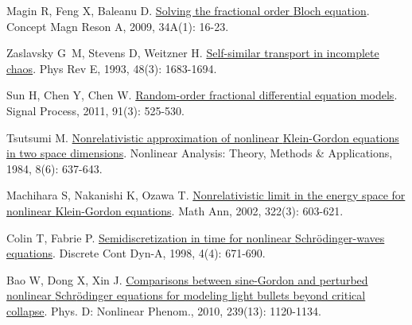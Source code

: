\begin{thebibliography}{79}
    Magin R, Feng X, Baleanu D.
    \newblock \href{https://onlinelibrary.wiley.com/doi/10.1002/cmr.a.20129}{Solving the fractional order {{Bloch}} equation}\allowbreak[J].
    \newblock Concept Magn Reson A, 2009, 34A\allowbreak (1): 16-23.
    
    Zaslavsky G~M, Stevens D, Weitzner H.
    \newblock \href{https://link.aps.org/doi/10.1103/PhysRevE.48.1683}{Self-similar transport in incomplete chaos}\allowbreak[J].
    \newblock Phys Rev E, 1993, 48\allowbreak (3): 1683-1694.
    
    Sun H, Chen Y, Chen W.
    \newblock \href{https://linkinghub.elsevier.com/retrieve/pii/S0165168410000447}{Random-order fractional differential equation models}\allowbreak[J].
    \newblock Signal Process, 2011, 91\allowbreak (3): 525-530.
    
    Tsutsumi M.
    \newblock \href{https://www.sciencedirect.com/science/article/pii/0362546X84900087}{Nonrelativistic approximation of nonlinear {{Klein-Gordon}} equations in two space dimensions}\allowbreak[J].
    \newblock Nonlinear Analysis: Theory, Methods \& Applications, 1984, 8\allowbreak (6): 637-643.
    
    Machihara S, Nakanishi K, Ozawa T.
    \newblock \href{http://link.springer.com/10.1007/s002080200008}{Nonrelativistic limit in the energy space for nonlinear {{Klein-Gordon}} equations}\allowbreak[J].
    \newblock Math Ann, 2002, 322\allowbreak (3): 603-621.
    
    Colin T, Fabrie P.
    \newblock \href{https://www.aimsciences.org/en/article/doi/10.3934/dcds.1998.4.671}{Semidiscretization in time for nonlinear {{Schr{\"o}dinger-waves}} equations}\allowbreak[J].
    \newblock Discrete Cont Dyn-A, 1998, 4\allowbreak (4): 671-690.
    
    Bao W, Dong X, Xin J.
    \newblock \href{https://linkinghub.elsevier.com/retrieve/pii/S0167278910000965}{Comparisons between sine-{{Gordon}} and perturbed nonlinear {{Schr{\"o}dinger}} equations for modeling light bullets beyond critical collapse}\allowbreak[J].
    \newblock Phys. D: Nonlinear Phenom., 2010, 239\allowbreak (13): 1120-1134.
    

\end{thebibliography}
